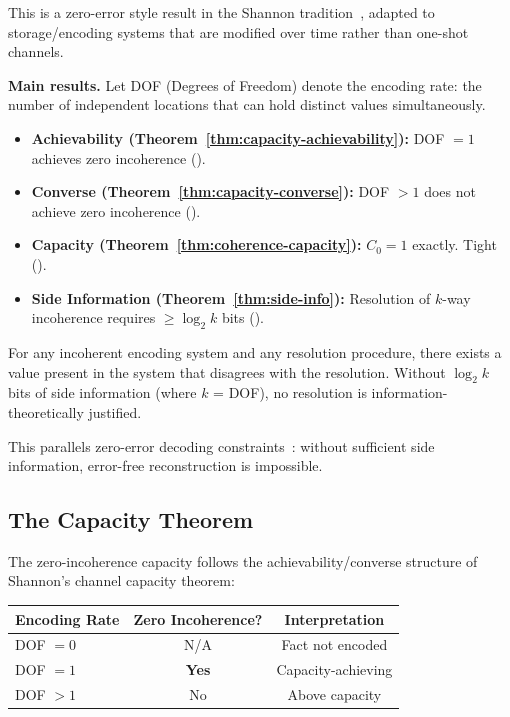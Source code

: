 This is a zero-error style result in the Shannon tradition~\cite{shannon1956zero,korner1973graphs,lovasz1979shannon}, adapted to storage/encoding systems that are modified over time rather than one-shot channels.

\textbf{Main results.} Let DOF (Degrees of Freedom) denote the encoding rate: the number of independent locations that can hold distinct values simultaneously.
\begin{itemize}
\tightlist
\item \textbf{Achievability (Theorem~\ref{thm:capacity-achievability}):} DOF $= 1$ achieves zero incoherence ().
\item \textbf{Converse (Theorem~\ref{thm:capacity-converse}):} DOF $> 1$ does not achieve zero incoherence ().
\item \textbf{Capacity (Theorem~\ref{thm:coherence-capacity}):} $C_0 = 1$ exactly. Tight ().
\item \textbf{Side Information (Theorem~\ref{thm:side-info}):} Resolution of $k$-way incoherence requires $\geq \log_2 k$ bits ().
\end{itemize}

\begin{theorem}
For any incoherent encoding system and any resolution procedure, there exists a value present in the system that disagrees with the resolution. Without $\log_2 k$ bits of side information (where $k$ = DOF), no resolution is information-theoretically justified.
\end{theorem}

This parallels zero-error decoding constraints~\cite{korner1973graphs,lovasz1979shannon}: without sufficient side information, error-free reconstruction is impossible.

\subsection{The Capacity Theorem}\label{sec:optimal-rate}

The zero-incoherence capacity follows the achievability/converse structure of Shannon's channel capacity theorem:

\begin{center}
\begin{tabular}{lcc}
\toprule
\textbf{Encoding Rate} & \textbf{Zero Incoherence?} & \textbf{Interpretation} \\
\midrule
DOF $= 0$ & N/A & Fact not encoded \\
DOF $= 1$ & \textbf{Yes} & Capacity-achieving \\
DOF $> 1$ & No & Above capacity \\
\bottomrule
\end{tabular}
\end{center}

